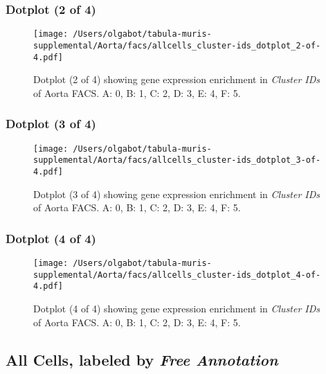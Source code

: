\clearpage
\subsubsection{Dotplot (2 of 4)}
\begin{figure}[h]
\centering
\texttt{[image: /Users/olgabot/tabula-muris-supplemental/Aorta/facs/allcells\_cluster-ids\_dotplot\_2-of-4.pdf]}

\caption{ Dotplot (2 of 4)  showing gene expression enrichment in \emph{Cluster IDs} of Aorta FACS. A: 0, B: 1, C: 2, D: 3, E: 4, F: 5.}
\end{figure}


\clearpage
\subsubsection{Dotplot (3 of 4)}
\begin{figure}[h]
\centering
\texttt{[image: /Users/olgabot/tabula-muris-supplemental/Aorta/facs/allcells\_cluster-ids\_dotplot\_3-of-4.pdf]}

\caption{ Dotplot (3 of 4)  showing gene expression enrichment in \emph{Cluster IDs} of Aorta FACS. A: 0, B: 1, C: 2, D: 3, E: 4, F: 5.}
\end{figure}


\clearpage
\subsubsection{Dotplot (4 of 4)}
\begin{figure}[h]
\centering
\texttt{[image: /Users/olgabot/tabula-muris-supplemental/Aorta/facs/allcells\_cluster-ids\_dotplot\_4-of-4.pdf]}

\caption{ Dotplot (4 of 4)  showing gene expression enrichment in \emph{Cluster IDs} of Aorta FACS. A: 0, B: 1, C: 2, D: 3, E: 4, F: 5.}
\end{figure}


\clearpage
\subsection{All Cells, labeled by \emph{Free Annotation}}

